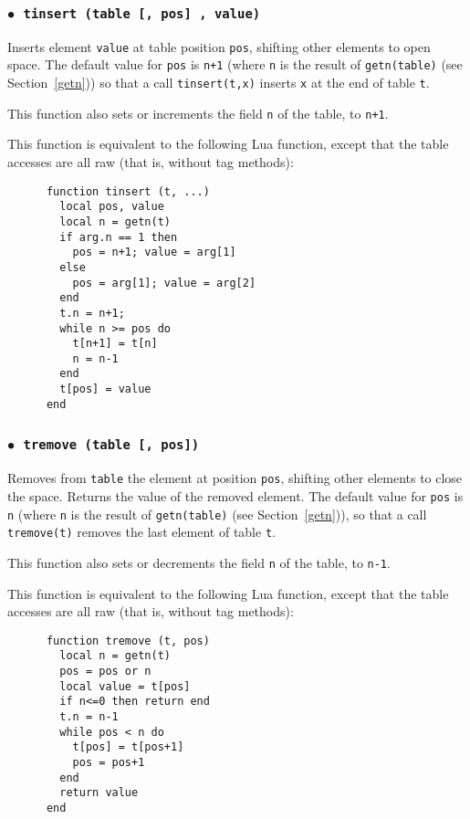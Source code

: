 \documentclass[11pt]{article}
\newcommand{\See}[1]{Section~\ref{#1}}
\newcommand{\see}[1]{(see \See{#1})}
\newcommand{\T}[1]{{\tt #1}}
\newcommand{\Deffunc}[1]{\index{#1}}
\newcommand{\ff}{$\bullet$\ }
\begin{document}
\subsubsection*{\ff \T{tinsert (table [, pos] , value)}}\Deffunc{tinsert}

Inserts element \verb|value| at table position \verb|pos|,
shifting other elements to open space.
The default value for \verb|pos| is \verb|n+1|
(where \verb|n| is the result of \verb|getn(table)| \see{getn})
so that a call \verb|tinsert(t,x)| inserts \verb|x| at the end
of table \verb|t|.

This function also sets or increments the field \verb|n| of the table,
to \verb|n+1|.

This function is equivalent to the following Lua function,
except that the table accesses are all raw (that is, without tag methods):
\begin{verbatim}
      function tinsert (t, ...)
        local pos, value
        local n = getn(t)
        if arg.n == 1 then
          pos = n+1; value = arg[1]
        else
          pos = arg[1]; value = arg[2]
        end
        t.n = n+1;
        while n >= pos do
          t[n+1] = t[n]
          n = n-1
        end
        t[pos] = value
      end
\end{verbatim}

\subsubsection*{\ff \T{tremove (table [, pos])}}\Deffunc{tremove}

Removes from \verb|table| the element at position \verb|pos|,
shifting other elements to close the space.
Returns the value of the removed element.
The default value for \verb|pos| is \verb|n|
(where \verb|n| is the result of \verb|getn(table)| \see{getn}),
so that a call \verb|tremove(t)| removes the last element
of table \verb|t|.

This function also sets or decrements the field \verb|n| of the table,
to \verb|n-1|.

This function is equivalent to the following Lua function,
except that the table accesses are all raw (that is, without tag methods):
\begin{verbatim}
      function tremove (t, pos)
        local n = getn(t)
        pos = pos or n
        local value = t[pos]
        if n<=0 then return end
        t.n = n-1
        while pos < n do
          t[pos] = t[pos+1]
          pos = pos+1
        end
        return value
      end
\end{verbatim}
\end{document}
